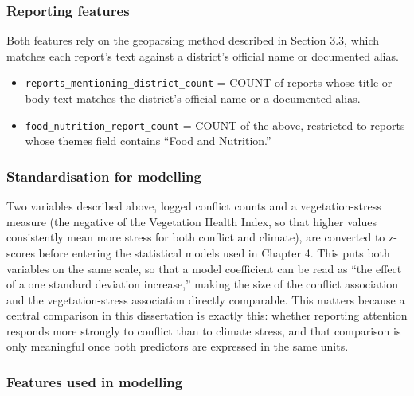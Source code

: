 \documentclass[12pt,a4paper]{article}
\begin{document}
\subsubsection{Reporting features}

Both features rely on the geoparsing method described in Section 3.3, which matches each report's text against a district's official name or documented alias.

\begin{itemize}
\item \texttt{reports\_mentioning\_district\_count} = COUNT of reports whose title or body text matches the district's official name or a documented alias.
\item \texttt{food\_nutrition\_report\_count} = COUNT of the above, restricted to reports whose themes field contains ``Food and Nutrition.''
\end{itemize}

\subsubsection{Standardisation for modelling}

Two variables described above, logged conflict counts and a vegetation-stress measure (the negative of the Vegetation Health Index, so that higher values consistently mean more stress for both conflict and climate), are converted to z-scores before entering the statistical models used in Chapter 4. This puts both variables on the same scale, so that a model coefficient can be read as ``the effect of a one standard deviation increase,'' making the size of the conflict association and the vegetation-stress association directly comparable. This matters because a central comparison in this dissertation is exactly this: whether reporting attention responds more strongly to conflict than to climate stress, and that comparison is only meaningful once both predictors are expressed in the same units.

\subsubsection{Features used in modelling}
\end{document}
